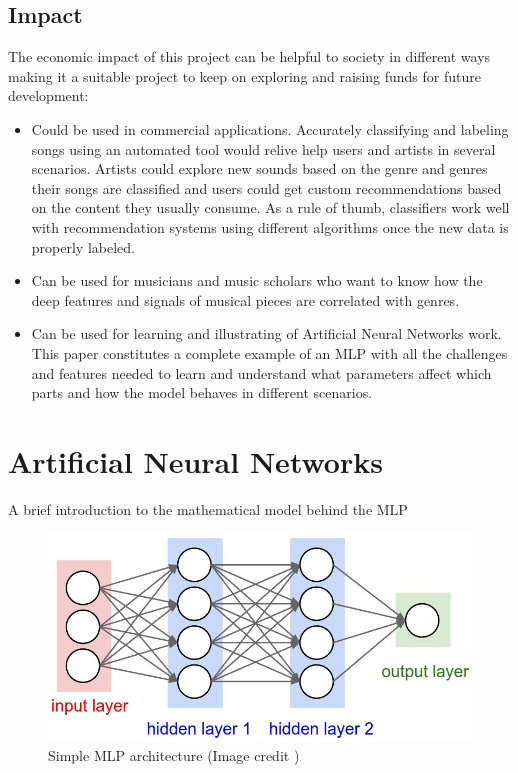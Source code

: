 \subsection{Impact}

The economic impact of this project can be helpful to society in different ways making it a suitable project to keep on exploring and raising funds for future development:

\begin{itemize}
    \item Could be used in commercial applications. 
        Accurately classifying and labeling songs using an automated tool would relive help users and artists in several scenarios. 
        Artists could explore new sounds based on the genre and genres their songs are classified and users could get custom recommendations based on the content they usually consume. 
        As a rule of thumb, classifiers work well with recommendation systems using different algorithms once the new data is properly labeled.
	\item Can be used for musicians and music scholars who want to know how the deep features and signals of musical pieces are correlated with genres.
	\item Can be used for learning and illustrating of Artificial Neural Networks work. This paper constitutes a complete example of an MLP with all the challenges and features needed to learn and understand what parameters affect which parts and how the model behaves in different scenarios.
\end{itemize}

\newpage

\section{Artificial Neural Networks}
A brief introduction to the mathematical model behind the MLP
\begin{figure}[th]
    \centering
    \includegraphics[width=1.0\textwidth]{Figures/NeuralNet}
    \decoRule
    \caption[Simple MLP architecture]{Simple MLP architecture (Image credit \cite{cs231n})}
    \label{fig:mlp}
\end{figure}

